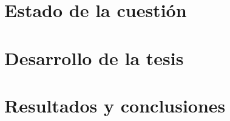 \documentclass[b5paper,nobib,makeidx,justified,twoside,symmetric]{tufte-book}
\title{\thetitle}
\author[\theauthor]{\theauthor}
\begin{document}

\frontmatter
\maketitle





\cleardoublepage

\tableofcontents
\listoffigures
\listoftables

\mainmatter

\part{Estado de la cuestión}



\part{Desarrollo de la tesis}


\part{Resultados y conclusiones}


\printglossaries

\backmatter



\printindex


\end{document}
